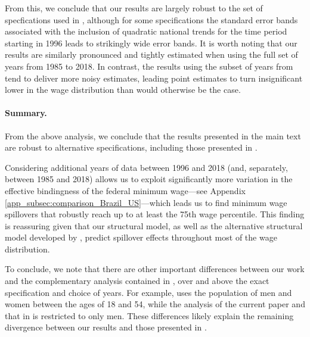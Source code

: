 From this, we conclude that our results are largely robust to the set of specfications used in , although for some specifications the standard error bands associated with the inclusion of quadratic national trends for the time period starting in 1996 leads to strikingly wide error bands. It is worth noting that our results are similarly pronounced and tightly estimated when using the full set of years from 1985 to 2018. In contrast, the results using the subset of years from  tend to deliver more noisy estimates, leading point estimates to turn insignificant lower in the wage distribution than would otherwise be the case.



\paragraph{Summary.}

From the above analysis, we conclude that the results presented in the main text are robust to alternative specifications, including those presented in .

Considering additional years of data between 1996 and 2018 (and, separately, between 1985 and 2018) allows us to exploit significantly more variation in the effective bindingness of the federal minimum wage---see Appendix \ref{app_subsec:comparison_Brazil_US}---which leads us to find minimum wage spillovers that robustly reach up to at least the 75th wage percentile. This finding is reassuring given that our structural model, as well as the alternative structural model developed by , predict spillover effects throughout most of the wage distribution.

To conclude, we note that there are other important differences between our work and the complementary analysis contained in , over and above the exact specification and choice of years. For example,  uses the population of men and women between the ages of 18 and 54, while the analysis of the current paper  and that in  is restricted to only men. These differences likely explain the remaining divergence between our results and those presented in .




